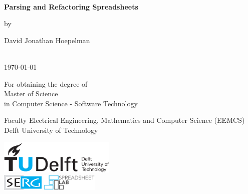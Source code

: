 \thispagestyle{empty}
\onecolumn
{%
\sffamily
\centering

~\vspace{\fill}

{\huge \bfseries
Parsing and Refactoring Spreadsheets
}

\vspace{2.0cm}

by

\vspace{2.0cm}

{\LARGE
David Jonathan Hoepelman
}

\vspace{3.0cm}

 \\
\today

\vspace{2.5cm}

For obtaining the degree of \\
Master of Science \\
in Computer Science - Software Technology \\

\vspace{0.5cm}

Faculty Electrical Engineering, Mathematics and Computer Science (EEMCS)\\
Delft University of Technology

\vspace{1.5cm}

\includegraphics[height=16mm]{0-title/tudelft.pdf}
\\ %
\vspace{0.75cm}
\includegraphics[height=8mm]{0-title/serg}
\hspace{0.5cm}
\includegraphics[height=8mm]{0-title/spreadsheet-lab}

\vspace{\fill}

}